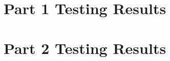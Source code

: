 \section{Part 1 Testing Results}\label{part1table}


\section{Part 2 Testing Results}\label{part2table}



